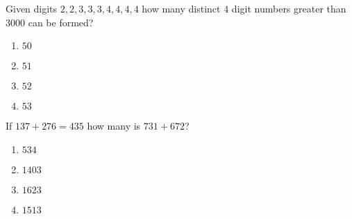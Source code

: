     \item Given digits $2,2,3,3,3,4,4,4,4$ how many distinct $4$ digit numbers greater than $3000$ can be formed?
    \begin{enumerate}
        \item $50$
        \item $51$
        \item $52$
        \item $53$
    \end{enumerate}
    \item If $137+276=435$ how many is $731+672$?
    \begin{enumerate}
        \item $534$
        \item $1403$
        \item $1623$
        \item $1513$
    \end{enumerate}
